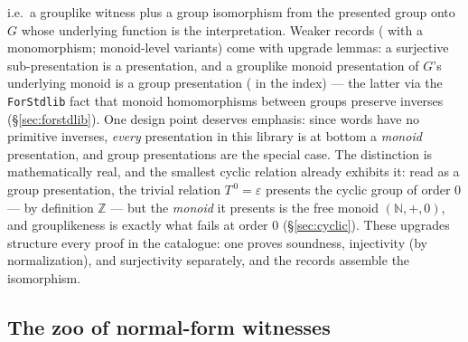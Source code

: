 i.e.\ a grouplike witness plus a group isomorphism from the presented
group onto $G$ whose underlying function is the interpretation.  Weaker
records ( with a monomorphism;
monoid-level variants) come with upgrade lemmas: a surjective
sub-presentation is a presentation, and a grouplike monoid presentation of
$G$'s underlying monoid is a group presentation
( in the index) --- the
latter via the \texttt{ForStdlib} fact that monoid homomorphisms between
groups preserve inverses (\S\ref{sec:forstdlib}).  One design point
deserves emphasis: since words have no primitive inverses, \emph{every}
presentation in this library is at bottom a \emph{monoid} presentation,
and group presentations are the  special case.  The
distinction is mathematically real, and the smallest cyclic relation
already exhibits it: read as a group presentation, the trivial relation
$T^{\,0} = \varepsilon$ presents the cyclic group of order $0$ --- by
definition $\mathbb{Z}$ --- but the \emph{monoid} it presents is the
free monoid $(\mathbb{N}, +, 0)$, and grouplikeness is exactly what
fails at order $0$ (\S\ref{sec:cyclic}).  These upgrades structure every proof in
the catalogue: one proves soundness, injectivity (by normalization), and
surjectivity separately, and the records assemble the isomorphism.

\subsection{The zoo of normal-form witnesses}\label{sec:nfproperty}

